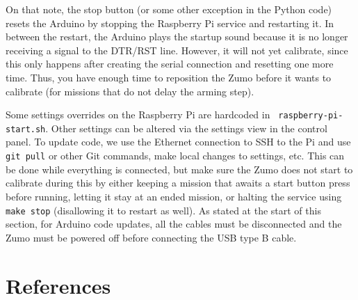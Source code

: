 \documentclass{article}
\begin{document}
On that note, the stop button (or some other exception in the Python code) 
resets the Arduino by stopping the Raspberry Pi service and restarting it. In 
between the restart, the Arduino plays the startup sound because it is no 
longer receiving a signal to the DTR/RST line. However, it will not yet 
calibrate, since this only happens after creating the serial connection and 
resetting one more time. Thus, you have enough time to reposition the Zumo 
before it wants to calibrate (for missions that do not delay the arming step).

Some settings overrides on the Raspberry Pi are hardcoded in {\tt 
raspberry-pi-start.sh}. Other settings can be altered via the settings view in 
the control panel. To update code, we use the Ethernet connection to SSH to the 
Pi and use {\tt git pull} or other Git commands, make local changes to 
settings, etc. This can be done while everything is connected, but make sure 
the Zumo does not start to calibrate during this by either keeping a mission 
that awaits a start button press before running, letting it stay at an ended 
mission, or halting the service using {\tt make stop} (disallowing it to 
restart as well). As stated at the start of this section, for Arduino code 
updates, all the cables must be disconnected and the Zumo must be powered off 
before connecting the USB type B cable.

\section{References}
\end{document}
